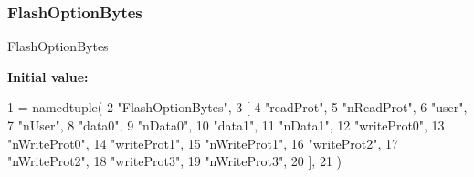 \subsubsection{\texorpdfstring{Flash\+Option\+Bytes}{FlashOptionBytes}}
{\footnotesize\ttfamily Flash\+Option\+Bytes}

{\bfseries Initial value\+:}
\begin{DoxyCode}
1 =  namedtuple(
2     \textcolor{stringliteral}{"FlashOptionBytes"},
3     [
4         \textcolor{stringliteral}{"readProt"},
5         \textcolor{stringliteral}{"nReadProt"},
6         \textcolor{stringliteral}{"user"},
7         \textcolor{stringliteral}{"nUser"},
8         \textcolor{stringliteral}{"data0"},
9         \textcolor{stringliteral}{"nData0"},
10         \textcolor{stringliteral}{"data1"},
11         \textcolor{stringliteral}{"nData1"},
12         \textcolor{stringliteral}{"writeProt0"},
13         \textcolor{stringliteral}{"nWriteProt0"},
14         \textcolor{stringliteral}{"writeProt1"},
15         \textcolor{stringliteral}{"nWriteProt1"},
16         \textcolor{stringliteral}{"writeProt2"},
17         \textcolor{stringliteral}{"nWriteProt2"},
18         \textcolor{stringliteral}{"writeProt3"},
19         \textcolor{stringliteral}{"nWriteProt3"},
20     ],
21 )
\end{DoxyCode}
